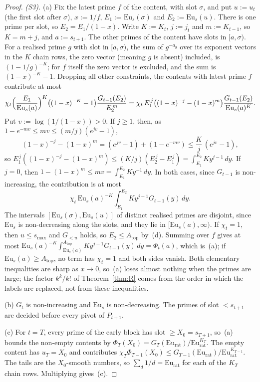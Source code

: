 \begin{proof}
\emph{(S3).} (a) Fix the latest prime $f$ of the content, with slot $\sigma$, and put $u:=u_t$ (the first slot after
$\sigma$), $x:=1/f$, $E_1:=\mathrm{Eu}_s(\sigma)$ and $E_2:=\mathrm{Eu}_s(u)$. There is one prime per slot, so
$E_2=E_1/(1-x)$. Write $K:=K_t$, $j:=j_t$ and $m:=K_{t-1}$, so $K=m+j$, and $a:=s_{t+1}$. The other primes of the content
have slots in $[a,\sigma)$. For a realised prime $g$ with slot in $[a,\sigma)$, the sum of $g^{-a_g}$ over its exponent
vectors in the $K$ chain rows, the zero vector (meaning $g$ is absent) included, is $(1-1/g)^{-K}$; for $f$ itself the
zero vector is excluded, and the sum is $(1-x)^{-K}-1$. Dropping all other constraints, the contents with latest prime
$f$ contribute at most
\[
  \chi_t\Bigl(\frac{E_1}{\mathrm{Eu}_s(a)}\Bigr)^{K}\bigl((1-x)^{-K}-1\bigr)\frac{G_{t-1}(E_2)}{E_2^{\,m}}
  =\chi_t\,E_1^{\,j}\bigl((1-x)^{-j}-(1-x)^{m}\bigr)\frac{G_{t-1}(E_2)}{\mathrm{Eu}_s(a)^{K}} .
\]
Put $v:=\log(1/(1-x))>0$. If $j\ge1$, then, as $1-e^{-mv}\le mv\le(m/j)(e^{jv}-1)$,
\[
  (1-x)^{-j}-(1-x)^{m}=(e^{jv}-1)+(1-e^{-mv})\le\frac Kj\,(e^{jv}-1),
\]
so $E_1^{\,j}((1-x)^{-j}-(1-x)^m)\le(K/j)(E_2^{\,j}-E_1^{\,j})=\int_{E_1}^{E_2}Ky^{j-1}\,dy$. If $j=0$, then
$1-(1-x)^m\le mv=\int_{E_1}^{E_2}Ky^{-1}\,dy$. In both cases, since $G_{t-1}$ is non-increasing, the contribution is at
most
\[
  \chi_t\,\mathrm{Eu}_s(a)^{-K}\int_{E_1}^{E_2}Ky^{j-1}G_{t-1}(y)\,dy .
\]
The intervals $[\mathrm{Eu}_s(\sigma),\mathrm{Eu}_s(u)]$ of distinct realised primes are disjoint, since
$\mathrm{Eu}_s$ is non-decreasing along the slots, and they lie in $[\mathrm{Eu}_s(a),\infty)$. If $\chi_t=1$, then
$u\le s_{\max}$ and $G_{<u}$ holds, so $E_2\le A_{\mathrm{top}}$ by~(d). Summing over $f$ gives at most
$\mathrm{Eu}_s(a)^{-K}\int_{\mathrm{Eu}_s(a)}^{A_{\mathrm{top}}}Ky^{j-1}G_{t-1}(y)\,dy=\Phi_t(a)$, which is~(a); if
$\mathrm{Eu}_s(a)\ge A_{\mathrm{top}}$, no term has $\chi_t=1$ and both sides vanish. Both elementary inequalities are
sharp as $x\to0$, so~(a) loses almost nothing when the primes are large; the factor $k^k/k!$ of Theorem~\ref{thm:R}
comes from the order in which the labels are replaced, not from these inequalities.

(b) $G_t$ is non-increasing and $\mathrm{Eu}_s$ is non-decreasing. The primes of slot $<s_{t+1}$ are decided before every
pivot of $P_{t+1}$.

(c) For $t=T$, every prime of the early block has slot $\ge X_0=s_{T+1}$, so~(a) bounds the non-empty contents by
$\Phi_T(X_0)=G_T(\mathrm{Eu}_{\mathrm{rat}})/\mathrm{Eu}_{\mathrm{rat}}^{K_T}$. The empty content has $u_T=X_0$ and
contributes $\chi_T\Phi_{T-1}(X_0)\le G_{T-1}(\mathrm{Eu}_{\mathrm{rat}})/\mathrm{Eu}_{\mathrm{rat}}^{K_{T-1}}$. The tails
are the $X_0$-smooth numbers, so $\sum_d1/d=\mathrm{Eu}_{\mathrm{rat}}$ for each of the $K_T$ chain rows. Multiplying
gives~(c).


\end{proof}
